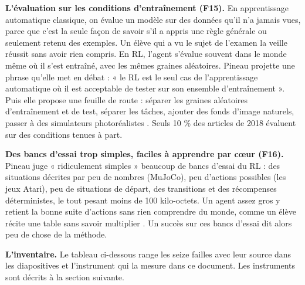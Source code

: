 \documentclass[11pt,a4paper]{article}
\begin{document}
\textbf{L'évaluation sur les conditions d'entraînement (F15).} En
apprentissage automatique classique, on évalue un modèle sur des données
qu'il n'a jamais vues, parce que c'est la seule façon de savoir s'il a
appris une règle générale ou seulement retenu des exemples. Un élève qui
a vu le sujet de l'examen la veille réussit sans avoir rien compris. En
RL, l'agent s'évalue souvent dans le monde même où il s'est entraîné,
avec les mêmes graines aléatoires. Pineau projette une phrase qu'elle
met en débat : « le RL est le seul cas de l'apprentissage automatique où
il est acceptable de tester sur son ensemble d'entraînement ». Puis elle
propose une feuille de route : séparer les graines aléatoires
d'entraînement et de test, séparer les tâches, ajouter des fonds d'image
naturels, passer à des simulateurs photoréalistes
\autocite{zhang2018dissection,zhang2018natural}. Seuls 10 \% des
articles de 2018 évaluent sur des conditions tenues à part.

\textbf{Des bancs d'essai trop simples, faciles à apprendre par cœur
(F16).} Pineau juge « ridiculement simples » beaucoup de bancs d'essai
du RL : des situations décrites par peu de nombres (MuJoCo), peu
d'actions possibles (les jeux Atari), peu de situations de départ, des
transitions et des récompenses déterministes, le tout pesant moins de
100 kilo-octets. Un agent assez gros y retient la bonne suite d'actions
sans rien comprendre du monde, comme un élève récite une table sans
savoir multiplier \autocite{machado2018revisiting}. Un succès sur ces
bancs d'essai dit alors peu de chose de la méthode.

\textbf{L'inventaire.} Le tableau ci-dessous range les seize failles
avec leur source dans les diapositives et l'instrument qui la mesure
dans ce document. Les instruments sont décrits à la section suivante.
\end{document}

